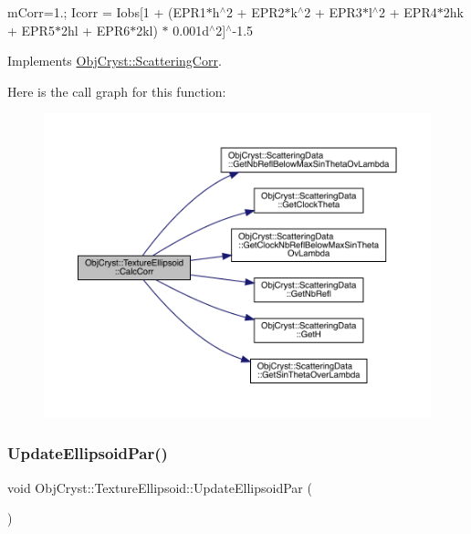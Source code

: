 m\+Corr=1.; Icorr = Iobs\mbox{[}1 + (E\+P\+R1$\ast$h$^\wedge$2 + E\+P\+R2$\ast$k$^\wedge$2 + E\+P\+R3$\ast$l$^\wedge$2 + E\+P\+R4$\ast$2hk + E\+P\+R5$\ast$2hl + E\+P\+R6$\ast$2kl) $\ast$ 0.\+001d$^\wedge$2\mbox{]}$^\wedge$-\/1.5 

Implements \mbox{\hyperlink{class_obj_cryst_1_1_scattering_corr_a437a916156f6d88c76cb01ca4c748c89}{Obj\+Cryst\+::\+Scattering\+Corr}}.

Here is the call graph for this function\+:
\nopagebreak
\begin{figure}[H]
\begin{center}
\leavevmode
\includegraphics[width=350pt]{class_obj_cryst_1_1_texture_ellipsoid_a5b7f34bd6511edb7f0eaab7c6a5e58b8_cgraph}
\end{center}
\end{figure}
\mbox{\label{class_obj_cryst_1_1_texture_ellipsoid_ae6e72bb7860e157d1c276791ba2148d5}} 
\subsubsection{\texorpdfstring{UpdateEllipsoidPar()}{UpdateEllipsoidPar()}}
{\footnotesize\ttfamily void Obj\+Cryst\+::\+Texture\+Ellipsoid\+::\+Update\+Ellipsoid\+Par (\begin{DoxyParamCaption}{ }\end{DoxyParamCaption})}

